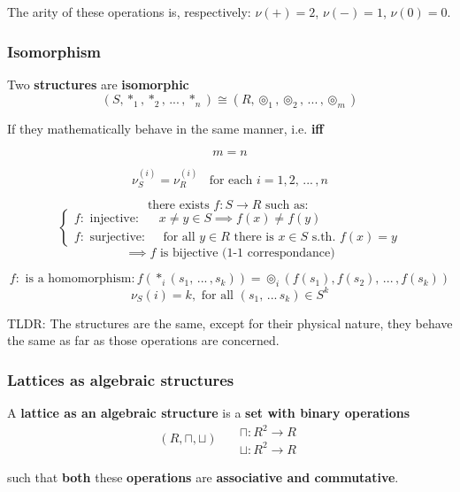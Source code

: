 \documentclass[11pt]{article}
\begin{document}
	The arity of these operations is, respectively: $\nu(+) = 2$, $\nu(-) = 1$, $\nu(0) = 0$.\\
	
	\newpage
	
	\subsubsection{Isomorphism}
	Two \textbf{structures} are \textbf{isomorphic}
	$$(S, \ast_1, \ast_2, \, ... \, , \ast_n) \cong (R, \circledcirc_1, \circledcirc_2, \, ... \, , \circledcirc_m) $$
	
	If they mathematically behave in the same manner, i.e. \textbf{iff}
	
	$$ m = n $$
	
	$$ \nu_S^{(i)} = \nu_R^{(i)} \;\; \text{ for each } i = 1,2, \, ... \, , n $$
	
	$$ \text{there exists } f : S \rightarrow R \text{ such as: } $$
	$$\begin{cases}
		f : \text{ injective: } & x \neq y \in S \implies f(x) \neq f(y) \\
		f: \text{ surjective: }  & \text{ for all } y \in R \text{ there is } x \in S \text{ s.th. } f(x) = y
	\end{cases}$$
	$$\implies f \text{ is bijective (1-1 correspondance)} $$
	
	$$ f: \text{ is a homomorphism}: f(\ast_i (s_1, \, ... \, , s_k)) = \circledcirc_i(f(s_1), f(s_2), \, ... \, , f(s_k))$$
	$$ \nu_S (i) = k, \text{ for all } (s_1, \, ... \, s_k) \in S^k $$
	
	TLDR: The structures are the same, except for their physical nature, they behave the same as far as those operations are concerned.\\
	
	\newpage
	
	\subsubsection{Lattices as algebraic structures}
	
	A \textbf{lattice as an algebraic structure} is a \textbf{set with binary operations}
	$$ (R, \sqcap, \sqcup) \;\;\;\;\;
	\begin{array}{c}
		\sqcap: R^2 \rightarrow R\\
		\sqcup: R^2 \rightarrow R
	\end{array}
	 $$
	
	such that \textbf{both} these \textbf{operations} are \textbf{associative and commutative}.\\
	
\end{document}
